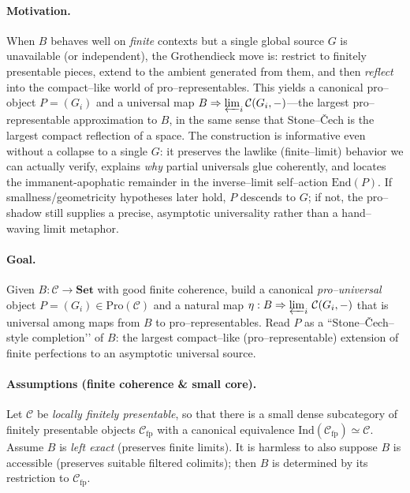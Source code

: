 \documentclass[11pt]{article}
\theoremstyle{upright}
\begin{document}
\medskip
\begin{infobox}[title={The Stone–Čech of Being}]
\label{box:stone-cech-being}
\paragraph{Motivation.}
When $B$ behaves well on \emph{finite} contexts but a single global source $G$ is unavailable (or independent), the Grothendieck move is: restrict to finitely presentable pieces, extend to the ambient generated from them, and then \emph{reflect} into the compact–like world of pro–representables. This yields a canonical pro–object $P=(G_i)$ and a universal map $B\Rightarrow\varprojlim_i\mathcal C(G_i,-)$—the largest pro–representable approximation to $B$, in the same sense that Stone–Čech is the largest compact reflection of a space. The construction is informative even without a collapse to a single $G$: it preserves the lawlike (finite–limit) behavior we can actually verify, explains \emph{why} partial universals glue coherently, and locates the immanent-apophatic remainder in the inverse–limit self–action $\mathrm{End}(P)$. If smallness/geometricity hypotheses later hold, $P$ descends to $G$; if not, the pro–shadow still supplies a precise, asymptotic universality rather than a hand–waving limit metaphor.

\medskip
\paragraph{Goal.}
Given $B:\mathcal C\to\mathbf{Set}$ with good finite coherence, build a canonical \emph{pro–universal} object
$P=(G_i)\in\mathrm{Pro}(\mathcal C)$ and a natural map
$\eta:B\Rightarrow \varprojlim_i\,\mathcal C(G_i,-)$
that is universal among maps from $B$ to pro–representables. Read $P$ as a “Stone–Čech–style completion’’ of $B$: the largest compact–like (pro–representable) extension of finite perfections to an asymptotic universal source. \citep{Borceux1994}

\medskip
\paragraph{Assumptions (finite coherence \& small core).}
Let $\mathcal C$ be \emph{locally finitely presentable}, so that there is a small dense subcategory of finitely presentable objects $\mathcal C_{\mathrm{fp}}$ with a canonical equivalence $\mathrm{Ind}(\mathcal C_{\mathrm{fp}})\simeq \mathcal C$. Assume $B$ is \emph{left exact} (preserves finite limits). It is harmless to also suppose $B$ is accessible (preserves suitable filtered colimits); then $B$ is determined by its restriction to $\mathcal C_{\mathrm{fp}}$.


\end{infobox}
\end{document}

